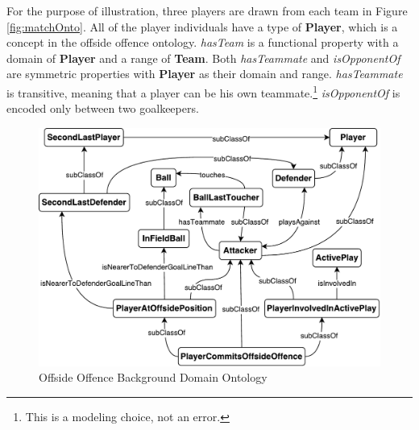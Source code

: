 For the purpose of illustration, three players are drawn from each team in Figure \ref{fig:matchOnto}.
All of the player individuals have a type of \textbf{Player}, which is a concept in the offside offence ontology.
\textit{hasTeam} is a functional property with a domain of \textbf{Player} and a range of \textbf{Team}.
Both \textit{hasTeammate} and \textit{isOpponentOf} are symmetric properties with \textbf{Player} as their domain and range.
\textit{hasTeammate} is transitive, meaning that a player can be his own teammate.\footnote{This is a modeling choice, not an error.}
\textit{isOpponentOf} is encoded only between two goalkeepers.

\begin{figure}[!htbp]
	\centering
	\includegraphics[width=5in]{img/5-soccerOnto}%
	\caption{Offside Offence Background Domain Ontology}
	\label{fig:soccerOnto}
\end{figure}

